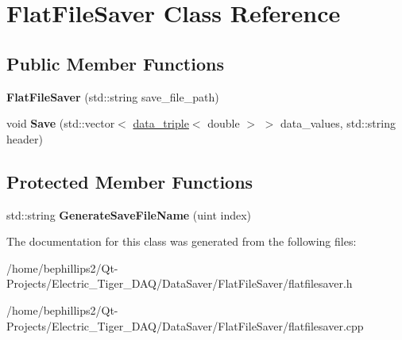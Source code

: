 \hypertarget{class_flat_file_saver}{}\section{Flat\+File\+Saver Class Reference}
\label{class_flat_file_saver}
\subsection*{Public Member Functions}
\begin{DoxyCompactItemize}
\item 
{\bfseries Flat\+File\+Saver} (std\+::string save\+\_\+file\+\_\+path)\hypertarget{class_flat_file_saver_aa755dafabdc59a86dc260cd24d201c3e}{}\label{class_flat_file_saver_aa755dafabdc59a86dc260cd24d201c3e}

\item 
void {\bfseries Save} (std\+::vector$<$ \hyperlink{structdata__triple}{data\+\_\+triple}$<$ double $>$ $>$ data\+\_\+values, std\+::string header)\hypertarget{class_flat_file_saver_ac4e8effd59db9c91d6df56869c31ffd0}{}\label{class_flat_file_saver_ac4e8effd59db9c91d6df56869c31ffd0}

\end{DoxyCompactItemize}
\subsection*{Protected Member Functions}
\begin{DoxyCompactItemize}
\item 
std\+::string {\bfseries Generate\+Save\+File\+Name} (uint index)\hypertarget{class_flat_file_saver_ad23419439ebf98aaac5affc720d92b73}{}\label{class_flat_file_saver_ad23419439ebf98aaac5affc720d92b73}

\end{DoxyCompactItemize}


The documentation for this class was generated from the following files\+:\begin{DoxyCompactItemize}
\item 
/home/bephillips2/\+Qt-\/\+Projects/\+Electric\+\_\+\+Tiger\+\_\+\+D\+A\+Q/\+Data\+Saver/\+Flat\+File\+Saver/flatfilesaver.\+h\item 
/home/bephillips2/\+Qt-\/\+Projects/\+Electric\+\_\+\+Tiger\+\_\+\+D\+A\+Q/\+Data\+Saver/\+Flat\+File\+Saver/flatfilesaver.\+cpp\end{DoxyCompactItemize}
